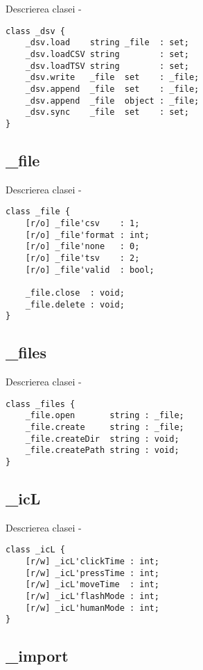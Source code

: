 \noindent Descrierea clasei  -
\begin{lstlisting}[numbers=none]
class _dsv {
	_dsv.load    string _file  : set;
	_dsv.loadCSV string        : set;
	_dsv.loadTSV string        : set;
	_dsv.write   _file  set    : _file;
	_dsv.append  _file  set    : _file;
	_dsv.append  _file  object : _file;
	_dsv.sync    _file  set    : set;
}
\end{lstlisting}

\subsection{{\color{orange} \_file}}

\noindent Descrierea clasei  -
\begin{lstlisting}[numbers=none]
class _file {
	[r/o] _file'csv    : 1;
	[r/o] _file'format : int;
	[r/o] _file'none   : 0;
	[r/o] _file'tsv    : 2;
	[r/o] _file'valid  : bool;
	
	_file.close  : void;
	_file.delete : void;
}
\end{lstlisting}

\subsection{{\color{orange} \_files}}

\noindent Descrierea clasei  -
\begin{lstlisting}[numbers=none]
class _files {
	_file.open       string : _file;
	_file.create     string : _file;
	_file.createDir  string : void;
	_file.createPath string : void;
}
\end{lstlisting}

\subsection{{\color{orange} \_icL}}

\noindent Descrierea clasei  -
\begin{lstlisting}[numbers=none]
class _icL {
	[r/w] _icL'clickTime : int;
	[r/w] _icL'pressTime : int;
	[r/w] _icL'moveTime  : int;
	[r/w] _icL'flashMode : int;
	[r/w] _icL'humanMode : int;
}
\end{lstlisting}

\subsection{{\color{orange} \_import}}


